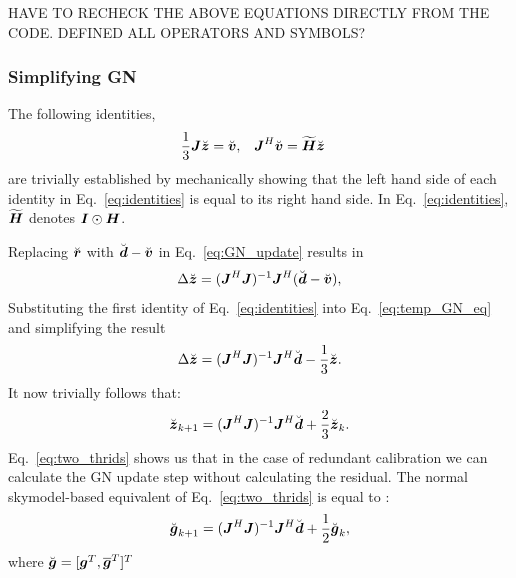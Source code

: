 \documentclass[useAMS,usenatbib]{mn2e}
\newcommand{\bz}{\bmath{z}}
\newcommand{\br}{\bmath{r}}
\newcommand{\bg}{\bmath{g}}
\newcommand{\bd}{\bmath{d}}
\newcommand{\bv}{\bmath{v}}
\newcommand{\bJ}{\bmath{J}}
\newcommand{\bH}{\bmath{H}}
\newcommand{\bI}{\bmath{I}}
\newcommand{\conj}[1]{\overline{#1}}
\begin{document}
HAVE TO RECHECK THE ABOVE EQUATIONS DIRECTLY FROM THE CODE.
DEFINED ALL OPERATORS AND SYMBOLS?




\subsubsection{Simplifying GN}

The following identities,
\begin{align}
\label{eq:identities}
\frac{1}{3}\bJ\breve{\bz} &= \breve{\bv}, & \bJ^H\breve{\bv} &= \widetilde{\bH}\breve{\bz} 
\end{align}
are trivially established by mechanically showing that the left hand side of each identity in Eq.~\eqref{eq:identities} is equal to its right hand side.
In Eq.~\eqref{eq:identities}, $\widetilde{\bH}$ denotes $\bI\odot\bH$.

Replacing $\breve{\br}$ with $\breve{\bd}-\breve{\bv}$ in Eq.~\eqref{eq:GN_update} results in
\begin{equation}
\label{eq:temp_GN_eq}
\Delta \breve{\bz} = (\bJ^H\bJ)^{-1}\bJ^H(\breve{\bd}-\breve{\bv}), 
\end{equation}
Substituting the first identity of Eq.~\eqref{eq:identities} into Eq.~\eqref{eq:temp_GN_eq} and simplifying the result 
\begin{equation}
\label{eq:one_thrid}
\Delta \breve{\bz} = (\bJ^H\bJ)^{-1}\bJ^H\breve{\bd}-\frac{1}{3}\breve{\bz}.
\end{equation}
It now trivially follows that:
\begin{equation}
\label{eq:two_thrids}
\breve{\bz}_{k+1} = (\bJ^H\bJ)^{-1}\bJ^H\breve{\bd} + \frac{2}{3}\breve{\bz}_{k}. 
\end{equation}
Eq.~\eqref{eq:two_thrids} shows us that in the case of redundant calibration we can calculate the GN update step without calculating the residual. The 
normal skymodel-based equivalent of Eq.~\eqref{eq:two_thrids} is equal to \citep{Smirnov2015}:
\begin{equation}
\label{eq:one_half}
\breve{\bg}_{k+1} = (\bJ^H\bJ)^{-1}\bJ^H\breve{\bd} + \frac{1}{2}\breve{\bg}_{k}, 
\end{equation}
where $\breve{\bg} = [\bg^T,\conj{\bg}^T]^T$
\end{document}
